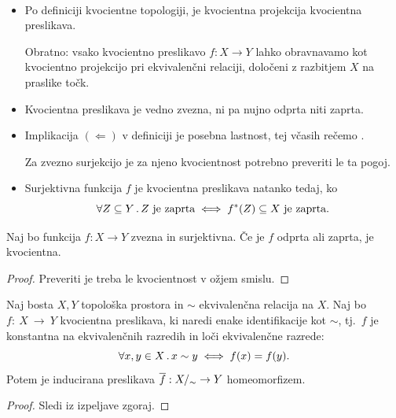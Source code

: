 \begin{opomba}
    \
    \begin{itemize}
        \item Po definiciji kvocientne topologiji, je kvocientna projekcija kvocientna preslikava. 
        
        Obratno: vsako kvocientno preslikavo \(f: X \to Y\) lahko obravnavamo kot kvocientno projekcijo pri ekvivalenčni relaciji, določeni z razbitjem \(X\) na praslike točk.
        \item Kvocientna preslikava je vedno zvezna, ni pa nujno odprta niti zaprta.
        \item Implikacija \((\Leftarrow)\) v definiciji je posebna lastnost, tej včasih rečemo .
        
        Za zvezno surjekcijo je za njeno kvocientnost potrebno preveriti le ta pogoj.
        \item Surjektivna funkcija \(f\) je kvocientna preslikava natanko tedaj, ko 
        \[\forall Z \subseteq Y \,.\, Z \ \text{je zaprta} \iff f^{*}(Z) \subseteq X \ \text{je zaprta}.\]
    \end{itemize}
\end{opomba}

\begin{lema}
    Naj bo funkcija \(f: X \to Y\) zvezna in surjektivna. Če je \(f\) odprta ali zaprta, je kvocientna.
\end{lema}

\begin{proof}
    Preveriti je treba le kvocientnost v ožjem smislu.
\end{proof}

\begin{izrek}
    Naj bosta \(X, Y\) topološka prostora in \(\sim\) ekvivalenčna relacija na \(X\). Naj bo \(f:~X~\to~Y\) kvocientna preslikava, ki naredi enake identifikacije kot \(\sim\), tj.\ \(f\) je konstantna na ekvivalenčnih razredih in loči ekvivalenčne razrede:
    \[\forall x, y \in X \,.\, x \sim y \iff f(x) = f(y).\]
    Potem je inducirana preslikava \(\overline{f}: {X/_\sim} \to Y\) homeomorfizem.
\end{izrek}

\begin{proof}
    Sledi iz izpeljave zgoraj.
\end{proof}

